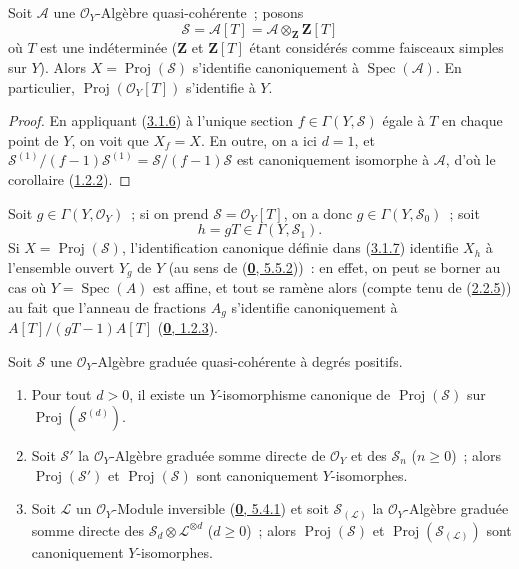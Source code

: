 \begin{corollary}[3.1.7]
\label{II.3.1.7-fr}
Soit $\mathcal{A}$ une $\mathcal{O}_Y$-Algèbre quasi-cohérente~; posons
\[
  \mathcal{S}=\mathcal{A}[T]
  =\mathcal{A}\otimes_{\mathbf{Z}}\mathbf{Z}[T]
\]
où $T$ est une indéterminée ($\mathbf{Z}$ et $\mathbf{Z}[T]$ étant
considérés comme faisceaux simples sur $Y$). Alors
$X=\operatorname{Proj}(\mathcal{S})$ s'identifie canoniquement à
$\operatorname{Spec}(\mathcal{A})$. En particulier,
$\operatorname{Proj}(\mathcal{O}_Y[T])$ s'identifie à $Y$.
\end{corollary}

\begin{proof}
En appliquant (\hyperref[II.3.1.6-fr]{3.1.6}) à l'unique section
$f\in\Gamma(Y,\mathcal{S})$ égale à $T$ en chaque point de $Y$, on voit que
$X_f=X$. En outre, on a ici $d=1$, et
$\mathcal{S}^{(1)}/(f-1)\mathcal{S}^{(1)}
=\mathcal{S}/(f-1)\mathcal{S}$ est canoniquement isomorphe à $\mathcal{A}$,
d'où le corollaire (\hyperref[II.1.2.2-fr]{1.2.2}).
\end{proof}

Soit $g\in\Gamma(Y,\mathcal{O}_Y)$~; si on prend
$\mathcal{S}=\mathcal{O}_Y[T]$, on a donc $g\in\Gamma(Y,\mathcal{S}_0)$~; soit
\[
  h=gT\in\Gamma(Y,\mathcal{S}_1).
\]
Si $X=\operatorname{Proj}(\mathcal{S})$, l'identification canonique définie
dans (\hyperref[II.3.1.7-fr]{3.1.7}) identifie $X_h$ à l'ensemble ouvert
$Y_g$ de $Y$ (au sens de (\hyperref[0.5.5.2-fr]{\textbf{0}, 5.5.2}))~: en effet, on
peut se borner au cas où $Y=\operatorname{Spec}(A)$ est affine, et tout se
ramène alors (compte tenu de (\hyperref[II.2.2.5-fr]{2.2.5})) au fait que
l'anneau de fractions $A_g$ s'identifie canoniquement à
$A[T]/(gT-1)A[T]$ (\hyperref[0.1.2.3-fr]{\textbf{0}, 1.2.3}).

\begin{proposition}[3.1.8]
\label{II.3.1.8-fr}
Soit $\mathcal{S}$ une $\mathcal{O}_Y$-Algèbre graduée quasi-cohérente à
degrés positifs.
\begin{enumerate}
  \item[\rm(i)] Pour tout $d>0$, il existe un $Y$-isomorphisme canonique de
    $\operatorname{Proj}(\mathcal{S})$ sur
    $\operatorname{Proj}(\mathcal{S}^{(d)})$.


  \item[\rm(ii)] Soit $\mathcal{S}'$ la $\mathcal{O}_Y$-Algèbre graduée
    somme directe de $\mathcal{O}_Y$ et des $\mathcal{S}_n$ ($n\geq0$)~;
    alors $\operatorname{Proj}(\mathcal{S}')$ et
    $\operatorname{Proj}(\mathcal{S})$ sont canoniquement $Y$-isomorphes.
  \item[\rm(iii)] Soit $\mathcal{L}$ un $\mathcal{O}_Y$-Module inversible
    \textup{(\hyperref[0.5.4.1-fr]{\textbf{0}, 5.4.1})} et soit $\mathcal{S}_{(\mathcal{L})}$ la
    $\mathcal{O}_Y$-Algèbre graduée somme directe des
    $\mathcal{S}_d\otimes\mathcal{L}^{\otimes d}$ ($d\geq0$)~; alors
    $\operatorname{Proj}(\mathcal{S})$ et
    $\operatorname{Proj}(\mathcal{S}_{(\mathcal{L})})$ sont canoniquement
    $Y$-isomorphes.
\end{enumerate}
\end{proposition}

